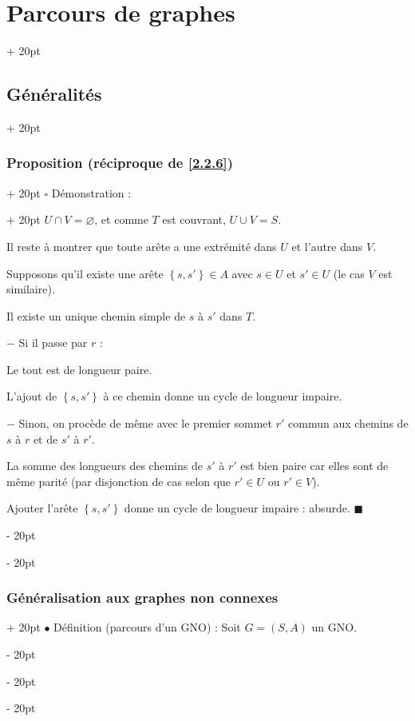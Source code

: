 \documentclass[a4paper, 12pt, twoside]{article}
\newcommand{\set}[1]{\left\{ #1 \right\}}
\newcommand{\ind}[1][20pt]{\advance\leftskip + #1}
\newcommand{\deind}[1][20pt]{\advance\leftskip - #1}
\newenvironment{indt}[2][20pt]{#2 \par \ind[#1]}{\par \deind} %
\begin{document}
\begin{indt}{\section{Parcours de graphes}}
\begin{indt}{\subsection{Généralités}}
\begin{indt}{\subsubsection{Proposition (réciproque de \ref{2.2.6})}}
\begin{indt}{$\square$ Démonstration :}
                    $U \cap V = \varnothing$, et comme $T$ est couvrant, $U \cup V = S$.

                    Il reste à montrer que toute arête a une extrémité dans $U$ et l'autre dans $V$.

                    Supposons qu'il existe une arête $\set{s, s'} \in A$ avec $s \in U$ et $s' \in U$ (le cas $V$ est similaire).

                    Il existe un unique chemin simple de $s$ à $s'$ dans $T$.

                    $-$ Si il passe par $r$ :

                    \begin{center}
                    \end{center}

                    Le tout est de longueur paire.

                    L'ajout de $\set{s, s'}$ à ce chemin donne un cycle de longueur impaire.

                    $-$ Sinon, on procède de même avec le premier sommet $r'$ commun aux chemins de $s$ à $r$ et de $s'$ à $r'$.

                    La somme des longueurs des chemins de $s'$ à $r'$ est bien paire car elles sont de même parité (par disjonction de cas selon que $r' \in U$ ou $r' \in V$).

                    Ajouter l'arête $\set{s, s'}$ donne un cycle de longueur impaire : absurde. $\blacksquare$
                \end{indt}
            \end{indt}

            \vspace{12pt}
            
            \begin{indt}{\subsubsection{Généralisation aux graphes non connexes}}
                $\bullet$ Définition (parcours d'un GNO) : Soit $G = (S, A)$ un GNO.


\end{indt}
\end{indt}
\end{indt}
\end{document}

